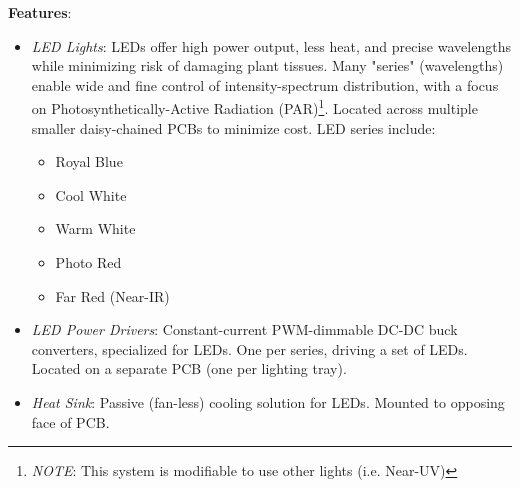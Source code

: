 \textbf{Features}:
\begin{itemize}
    \item \textit{LED Lights}: LEDs offer high power output, less heat, and precise wavelengths while minimizing risk of damaging plant tissues. Many "series" (wavelengths) enable wide and fine control of intensity-spectrum distribution, with a focus on Photosynthetically-Active Radiation (PAR)\footnote{\textit{NOTE}: This system is modifiable to use other lights (i.e. Near-UV)}. Located across multiple smaller daisy-chained PCBs to minimize cost. LED series include:
    \begin{itemize}
        \item Royal Blue
        \item Cool White
        \item Warm White
        \item Photo Red
        \item Far Red (Near-IR)
    \end{itemize}
    \item \textit{LED Power Drivers}: Constant-current PWM-dimmable DC-DC buck converters, specialized for LEDs. One per series, driving a set of LEDs. Located on a separate PCB (one per lighting tray).
    \item \textit{Heat Sink}: Passive (fan-less) cooling solution for LEDs. Mounted to opposing face of PCB.
\end{itemize}